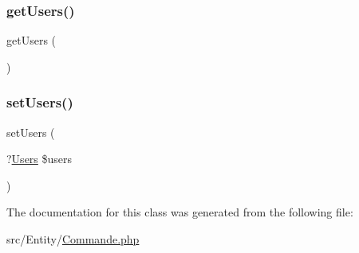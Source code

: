 \subsubsection{\texorpdfstring{get\+Users()}{getUsers()}}
{\footnotesize\ttfamily get\+Users (\begin{DoxyParamCaption}{ }\end{DoxyParamCaption})}

\mbox{\label{class_app_1_1_entity_1_1_commande_a8128851d16ba70460949bc23dc67c487}} 
\subsubsection{\texorpdfstring{set\+Users()}{setUsers()}}
{\footnotesize\ttfamily set\+Users (\begin{DoxyParamCaption}\item[{?\mbox{\hyperlink{class_app_1_1_entity_1_1_users}{Users}}}]{\$users }\end{DoxyParamCaption})}



The documentation for this class was generated from the following file\+:\begin{DoxyCompactItemize}
\item 
src/\+Entity/\mbox{\hyperlink{_commande_8php}{Commande.\+php}}\end{DoxyCompactItemize}
